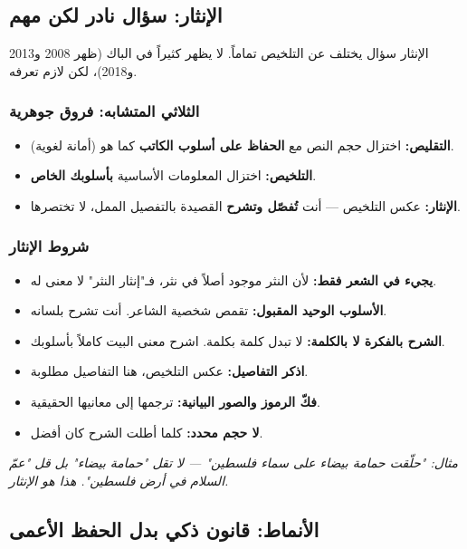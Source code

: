 \documentclass[12pt,a4paper]{book}
\newcommand{\quoteAr}[1]{%
	\begin{myquote}
		\itshape #1
	\end{myquote}
}
\begin{document}
	\subsection{الإنثار: سؤال نادر لكن مهم}
	
	الإنثار سؤال يختلف عن التلخيص تماماً. لا يظهر كثيراً في الباك (ظهر 2008 و2013 و2018)، لكن لازم تعرفه.
	
	\subsubsection*{الثلاثي المتشابه: فروق جوهرية}
	
	\begin{itemize}
		\item \textbf{التقليص:} اختزال حجم النص مع \textbf{الحفاظ على أسلوب الكاتب} كما هو (أمانة لغوية).
		\item \textbf{التلخيص:} اختزال المعلومات الأساسية \textbf{بأسلوبك الخاص}.
		\item \textbf{الإنثار:} عكس التلخيص — أنت \textbf{تُفصّل وتشرح} القصيدة بالتفصيل الممل، لا تختصرها.
	\end{itemize}
	
	\subsubsection*{شروط الإنثار}
	
	\begin{itemize}
		\item \textbf{يجيء في الشعر فقط:} لأن النثر موجود أصلاً في نثر، فـ"إنثار النثر" لا معنى له.
		\item \textbf{الأسلوب الوحيد المقبول:} تقمص شخصية الشاعر. أنت تشرح بلسانه.
		\item \textbf{الشرح بالفكرة لا بالكلمة:} لا تبدل كلمة بكلمة. اشرح معنى البيت كاملاً بأسلوبك.
		\item \textbf{اذكر التفاصيل:} عكس التلخيص، هنا التفاصيل مطلوبة.
		\item \textbf{فكّ الرموز والصور البيانية:} ترجمها إلى معانيها الحقيقية.
		\item \textbf{لا حجم محدد:} كلما أطلت الشرح كان أفضل.
	\end{itemize}
	
	\quoteAr{مثال: "حلّقت حمامة بيضاء على سماء فلسطين" — لا تقل "حمامة بيضاء" بل قل "عمّ السلام في أرض فلسطين". هذا هو الإنثار.}
	
	\subsection{الأنماط: قانون ذكي بدل الحفظ الأعمى}
	
\end{document}
